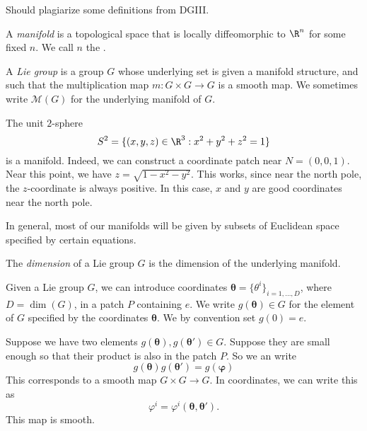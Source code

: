 \documentclass[a4paper]{article}
\begin{document}
\begin{own}
  Should plagiarize some definitions from DGIII.
\end{own} %

\begin{defi}[Manifold]
  A \emph{manifold} is a topological space that is locally diffeomorphic to $\R^n$ for some fixed $n$. We call $n$ the .
\end{defi}

\begin{defi}
  A \emph{Lie group} is a group $G$ whose underlying set is given a manifold structure, and such that the multiplication map $m: G \times G \to G$ is a smooth map. We sometimes write $\mathcal{M}(G)$ for the underlying manifold of $G$.
\end{defi}

\begin{eg}
  The unit $2$-sphere
  \[
    S^2 = \{(x, y, z) \in \R^3: x^2 + y^2 + z^2 = 1\}
  \]
  is a manifold. Indeed, we can construct a coordinate patch near $N = (0, 0, 1)$. Near this point, we have $z = \sqrt{1 - x^2 - y^2}$. This works, since near the north pole, the $z$-coordinate is always positive. In this case, $x$ and $y$ are good coordinates near the north pole.
\end{eg}

In general, most of our manifolds will be given by subsets of Euclidean space specified by certain equations.

\begin{defi}
  The \emph{dimension} of a Lie group $G$ is the dimension of the underlying manifold.
\end{defi}

Given a Lie group $G$, we can introduce coordinates $\boldsymbol\theta = \{\theta^i\}_{i = 1, \ldots, D}$, where $D = \dim(G)$, in a patch $P$ containing $e$. We write $g(\boldsymbol\theta) \in G$ for the element of $G$ specified by the coordinates $\boldsymbol\theta$. We by convention set $g(0) = e$.

Suppose we have two elements $g(\boldsymbol\theta), g(\boldsymbol\theta') \in G$. Suppose they are small enough so that their product is also in the patch $P$. So we an write
\[
  g(\boldsymbol\theta) g(\boldsymbol\theta') = g(\boldsymbol\varphi)
\]
This corresponds to a smooth map $G \times G \to G$. In coordinates, we can write this as
\[
  \varphi^i = \varphi^i(\boldsymbol\theta, \boldsymbol\theta').
\]
This map is smooth.
\end{document}
